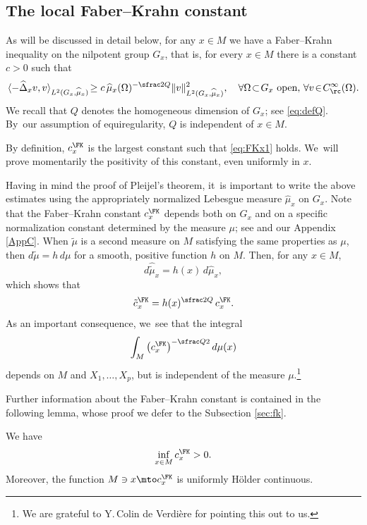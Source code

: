 \subsection{The local Faber--Krahn constant}
As will be discussed in detail below, for any $x\in M$ we have a Faber--Krahn inequality on the nilpotent group $G_x$, that is, for every $x\in M$ there is a constant $c>0$ such that
\begin{equation} \label{eq:FKx1}
\langle - \widehat \Delta_x v,v\rangle_{L^2(G_x,\widehat\mu_x)} \!\geq c\,\widehat\mu_x(\Omega)^{-\sfrac 2Q} \| v\|_{L^2(G_x,\widehat\mu_x)}^2,
\quad \forall \Omega\!\subset\! G_x \ \text{open},\,\forall v\!\in\! C_\rc^\infty (\Omega).
\end{equation}
We recall that $Q$ denotes the homogeneous dimension of $G_x$; see \eqref{eq:defQ}. By~our assumption of equiregularity, $Q$ is independent of $x\in M$.

By definition, $c_x^\FK$ is the largest constant such that \eqref{eq:FKx1} holds. We~will prove momentarily the positivity of this constant, even uniformly in $x$.

\begin{remark}\label{rem:fkindepmeas}
Having in mind the proof of Pleijel's theorem, it~is important to write the above estimates using the appropriately normalized Lebesgue measure $\widehat \mu_x$ on $G_x$. Note that the Faber--Krahn constant $c_x^\FK$ depends both on $G_x$ and on a specific normalization constant determined by the measure $\mu$; see \cite[App.\,A.5.6]{CHT1} and our Appendix \ref{AppC}. When $\tilde\mu$ is a second measure on $M$ satisfying the same properties as $\mu$, then $d\tilde\mu = h\,d\mu$ for a smooth, positive function $h$ on $M$. Then, for any $x\in M$,
\[
d\widehat{\tilde\mu}_x = h(x) \,d\widehat\mu_x,
\]
which shows that
\[
\tilde c^\FK_x = h(x)^{\sfrac 2Q} \,c^\FK_x.
\]
As an important consequence, we~see that the integral
\[
\int_M \left(c^\FK_x\right)^{-\sfrac Q2}d\mu(x)
\]
depends on $M$ and $X_1,\ldots, X_p$, but is independent of the measure $\mu$.\footnote{We are grateful to Y.\,Colin de Verdière for pointing this out to us.}
\end{remark}

Further information about the Faber--Krahn constant is contained in the following lemma, whose proof we defer to the Subsection \ref{sec:fk}.

\begin{lemma}\label{faberkrahn}
We have
\begin{equation}\label{eq:fk1}
\inf_{x\in M} c_x^\FK >0.
\end{equation}
Moreover, the function $M\ni x\mto c_x^\FK$ is uniformly Hölder continuous.
\end{lemma}

